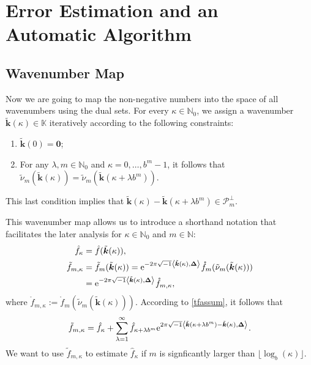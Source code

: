 \documentclass[graybox,footinfo]{svmult}
\newcommand{\naturals}{\mathbb{N}} %
\newcommand{\vzero}{\boldsymbol{0}} %
\newcommand{\vDelta}{\boldsymbol{\Delta}}    %
\newcommand{\natzero}{\mathbb{N}_{0}}
\newcommand{\bbK}{\mathbb{K}}
\newcommand{\ip}[3][{}]{\ensuremath{\left \langle #2, #3 \right \rangle_{#1}}}
\newcommand{\vk}{\boldsymbol{k}}    %
\newcommand{\tvk}{\tilde{\vk}}
\newcommand{\tnu}{\tilde{\nu}}
\newcommand{\cp}{\mathcal{P}}
\newcommand{\hf}{\hat{f}}
\newcommand{\tf}{\tilde{f}}
\newcommand{\rf}{\mathring{f}}
\begin{document}
\section{Error Estimation and an Automatic Algorithm}

\subsection{Wavenumber Map}

Now we are going to map the non-negative numbers into the space of all wavenumbers using the dual sets.  For every $\kappa \in \natzero$, we assign a wavenumber $\tvk(\kappa) \in \bbK$ iteratively according to the following constraints:
\begin{enumerate}
\renewcommand{\labelenumi}{\roman{enumi})}

\item $\tvk(0)= \vzero$;

\item For any $\lambda, m \in \natzero$ and $\kappa=0, \ldots, b^m-1$, it follows that  $\tnu_m(\tvk(\kappa))=\tnu_m(\tvk(\kappa+\lambda b^m))$.

\end{enumerate}
This last condition implies that $\tvk(\kappa) - \tvk(\kappa+\lambda b^m) \in \cp_m^{\perp}$.

This wavenumber map allows us to introduce a shorthand notation that facilitates the later analysis for $\kappa \in \natzero$ and $m \in \naturals$:
\begin{align*}
\hf_{\kappa} & =\hf(\tvk(\kappa)), \\
\tf_{m,\kappa}& = \tf_m(\tvk(\kappa))= \E^{-2 \pi \sqrt{-1} \ip{\tvk(\kappa)}{\vDelta}} \rf_m(\tnu_m(\tvk(\kappa)))\\
&= \E^{-2 \pi \sqrt{-1} \ip{\tvk(\kappa)}{\vDelta}} \rf_{m,\kappa},
\end{align*}
where $\rf_{m,\kappa}:=\rf_m(\tnu_m(\tvk(\kappa)))$. According to \eqref{tfassum}, it follows that
\begin{equation}
\tf_{m,\kappa} = \hf_{\kappa} + \sum_{\lambda=1}^{\infty} \hf_{\kappa+\lambda b^{m}} \E^{2 \pi \sqrt{-1} \ip{\tvk(\kappa+\lambda b^{m}) - \tvk(\kappa)}{\vDelta}}.
\label{tfassumc}
\end{equation}
We want to use $\tf_{m,\kappa}$ to estimate $\hf_{\kappa}$ if $m$ is signficantly larger than $\lfloor \log_b(\kappa) \rfloor$.
\end{document}
